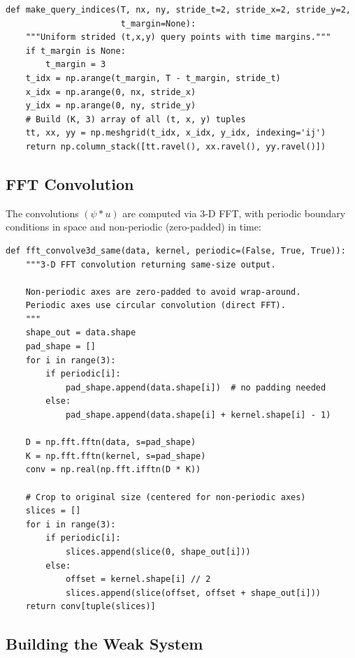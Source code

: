 \documentclass[11pt]{article}
\begin{document}
\begin{lstlisting}[caption={system.py --- Query point generation}]
def make_query_indices(T, nx, ny, stride_t=2, stride_x=2, stride_y=2,
                       t_margin=None):
    """Uniform strided (t,x,y) query points with time margins."""
    if t_margin is None:
        t_margin = 3
    t_idx = np.arange(t_margin, T - t_margin, stride_t)
    x_idx = np.arange(0, nx, stride_x)
    y_idx = np.arange(0, ny, stride_y)
    # Build (K, 3) array of all (t, x, y) tuples
    tt, xx, yy = np.meshgrid(t_idx, x_idx, y_idx, indexing='ij')
    return np.column_stack([tt.ravel(), xx.ravel(), yy.ravel()])
\end{lstlisting}


\subsection{FFT Convolution}

The convolutions $(\psi * u)$ are computed via 3-D FFT, with periodic
boundary conditions in space and non-periodic (zero-padded) in time:

\begin{lstlisting}[caption={system.py --- FFT convolution (3D)}]
def fft_convolve3d_same(data, kernel, periodic=(False, True, True)):
    """3-D FFT convolution returning same-size output.

    Non-periodic axes are zero-padded to avoid wrap-around.
    Periodic axes use circular convolution (direct FFT).
    """
    shape_out = data.shape
    pad_shape = []
    for i in range(3):
        if periodic[i]:
            pad_shape.append(data.shape[i])  # no padding needed
        else:
            pad_shape.append(data.shape[i] + kernel.shape[i] - 1)

    D = np.fft.fftn(data, s=pad_shape)
    K = np.fft.fftn(kernel, s=pad_shape)
    conv = np.real(np.fft.ifftn(D * K))

    # Crop to original size (centered for non-periodic axes)
    slices = []
    for i in range(3):
        if periodic[i]:
            slices.append(slice(0, shape_out[i]))
        else:
            offset = kernel.shape[i] // 2
            slices.append(slice(offset, offset + shape_out[i]))
    return conv[tuple(slices)]
\end{lstlisting}


\subsection{Building the Weak System}
\end{document}
